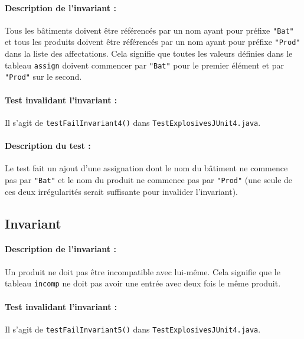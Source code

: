 \documentclass{article}
\begin{document}
\paragraph{Description de l'invariant :} Tous les bâtiments doivent être référencés par un nom ayant pour préfixe \texttt{"Bat"} et tous les produits doivent être référencés par un nom ayant pour préfixe \texttt{"Prod"} dans la liste des affectations. Cela signifie que toutes les valeurs définies dans le tableau \texttt{assign} doivent commencer par \texttt{"Bat"} pour le premier élément et par \texttt{"Prod"} sur le second.

\vspace{-0.2cm}
\paragraph{Test invalidant l'invariant :} Il s'agit de \texttt{testFailInvariant4()} dans \texttt{TestExplosivesJUnit4.java}.

\vspace{-0.2cm}
\paragraph{Description du test :} Le test fait un ajout d'une assignation dont le nom du bâtiment ne commence pas par \texttt{"Bat"} et le nom du produit ne commence pas par \texttt{"Prod"} (une seule de ces deux irrégularités serait suffisante pour invalider l'invariant).

\subsection{Invariant }

\paragraph{Description de l'invariant :} Un produit ne doit pas être incompatible avec lui-même. Cela signifie que le tableau \texttt{incomp} ne doit pas avoir une entrée avec deux fois le même produit.

\vspace{-0.2cm}
\paragraph{Test invalidant l'invariant :} Il s'agit de \texttt{testFailInvariant5()} dans \texttt{TestExplosivesJUnit4.java}.

\vspace{-0.2cm}
\end{document}

